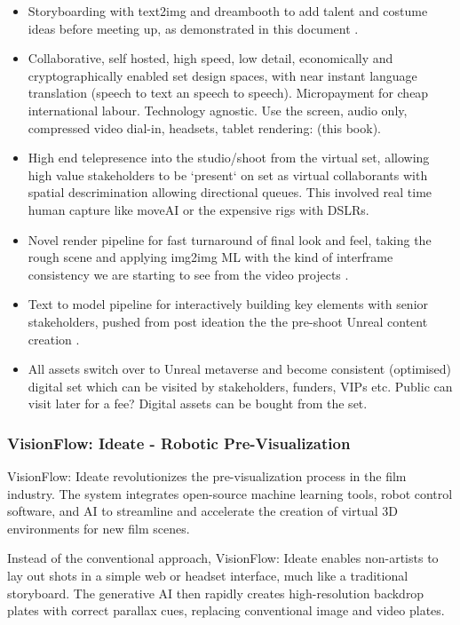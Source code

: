 \begin{itemize}
\item Storyboarding with text2img and dreambooth to add talent and costume ideas before meeting up, as demonstrated in this document \cite{ruiz2022dreambooth}.
\item Collaborative, self hosted, high speed, low detail, economically and cryptographically enabled set design spaces, with near instant language translation (speech to text an speech to speech). Micropayment for cheap international labour. Technology agnostic. Use the screen, audio only, compressed video dial-in, headsets, tablet rendering: (this book).
\item High end telepresence \cite{Roberts2015, OHare2018, Fairchild2017, OHare2016} into the studio/shoot from the virtual set, allowing high value stakeholders to be `present` on set as virtual collaborants with spatial descrimination allowing directional queues. This involved real time human capture like moveAI or the expensive rigs with DSLRs.
\item Novel render pipeline for fast turnaround of final look and feel, taking the rough scene and applying img2img ML with the kind of interframe consistency we are starting to see from the video projects \cite{anonymous2023phenaki}.
\item Text to model pipeline for interactively building key elements with senior stakeholders, pushed from post ideation the the  pre-shoot Unreal content creation \cite{poole2022dreamfusion}.
\item All assets switch over to Unreal metaverse and become consistent (optimised) digital set which can be visited by stakeholders, funders, VIPs etc. Public can visit later for a fee? Digital assets can be bought from the set.
\end{itemize}
\subsubsection{VisionFlow: Ideate - Robotic Pre-Visualization}

VisionFlow: Ideate revolutionizes the pre-visualization process in the film industry. The system integrates open-source machine learning tools, robot control software, and AI to streamline and accelerate the creation of virtual 3D environments for new film scenes.\par

Instead of the conventional approach, VisionFlow: Ideate enables non-artists to lay out shots in a simple web or headset interface, much like a traditional storyboard. The generative AI then rapidly creates high-resolution backdrop plates with correct parallax cues, replacing conventional image and video plates.\par

